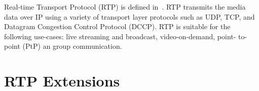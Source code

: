 Real-time Transport Protocol (RTP) is defined in~\cite{rfc3550}. RTP transmits
the media data over IP using a variety of transport layer protocols such as
UDP, TCP, and Datagram Congestion Control Protocol (DCCP). RTP is suitable for
the following use-cases: live streaming and broadcast, video-on-demand, point-
to-point (PtP) an group communication.





\section{RTP Extensions}
\label{rtp.ext}
